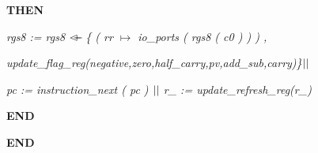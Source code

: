 \documentclass[a4paper]{llncs}
\begin{document}
\hspace*{0.20in}\bf THEN

\hspace*{0.40in}\it rgs8 \rm := \it rgs8  $\lover$  \rm \{ \rm ( \it rr  $\mapsto$  \it io\_ports \rm ( \it rgs8 \rm ( \it c0 \rm ) \rm ) \rm ) \rm ,

\hspace*{0.40in}\it update\_flag\_reg\rm (\it negative\rm,\it zero\rm,\it half\_carry\rm,\it pv\rm,\it add\_sub\rm,\it carry)\rm\}$\mbox{$\mid\mid$}$

\hspace*{0.40in}\it pc \rm := \it instruction\_next \rm ( \it pc \rm )  $\mbox{$\mid\mid$}$  \it r\_ \rm := \it update\_refresh\_reg\rm (\it r\_\rm )

\hspace*{0.20in}\bf END

\hspace*{0.0in}\bf END \rm


\end{document}
